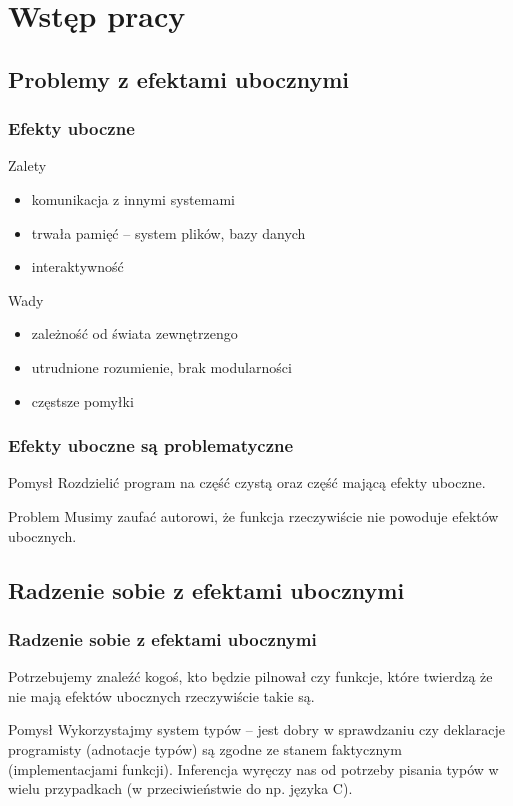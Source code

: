 
\section{Wstęp pracy}

\subsection{Problemy z efektami ubocznymi}

\newcommand\pro{\item[\textcolor{example text.fg}{$+$}]}
\newcommand\con{\item[\alert{$-$}]}

\begin{frame}
  \frametitle{Efekty uboczne}
  \begin{exampleblock}{Zalety}
    \begin{itemize}
      \pro komunikacja z innymi systemami
      \pro trwała pamięć -- system plików, bazy danych
      \pro interaktywność
    \end{itemize}
  \end{exampleblock}
  \begin{alertblock}{Wady}
    \begin{itemize}
      \con zależność od świata zewnętrzengo
      \con utrudnione rozumienie, brak modularności
      \con częstsze pomyłki
    \end{itemize}
  \end{alertblock}
\end{frame}

\begin{frame}
  \frametitle{Efekty uboczne są problematyczne}
  \begin{exampleblock}{Pomysł}
    Rozdzielić program na część czystą oraz część mającą efekty uboczne.
  \end{exampleblock}
  \pause
  \vspace{1em}
  \begin{alertblock}{Problem}
    Musimy zaufać autorowi, że funkcja rzeczywiście nie powoduje efektów ubocznych.
  \end{alertblock}
\end{frame}

\subsection{Radzenie sobie z efektami ubocznymi}

\begin{frame}
  \frametitle{Radzenie sobie z efektami ubocznymi}
    Potrzebujemy znaleźć kogoś, kto będzie pilnował czy funkcje, które twierdzą że nie mają efektów ubocznych rzeczywiście takie są.
  \pause
  \begin{exampleblock}{Pomysł}
    Wykorzystajmy system typów -- jest dobry w sprawdzaniu czy deklaracje programisty (adnotacje typów) są zgodne ze stanem faktycznym (implementacjami funkcji). Inferencja wyręczy nas od potrzeby pisania typów w wielu przypadkach (w przeciwieństwie do np. języka C).
  \end{exampleblock}
\end{frame}

